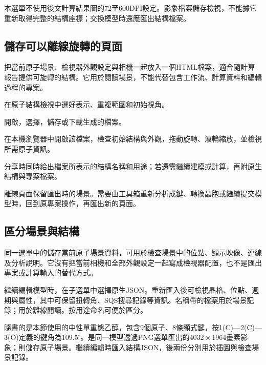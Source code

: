 本選單不使用後文計算結果圖的72至600DPI設定。影象檔案儲存檢視，不能據它重新取得完整的結構座標；交換模型時還應匯出結構檔案。



\subsection{儲存可以離線旋轉的頁面}

把當前原子場景、檢視器外觀設定與相機一起放入一個HTML檔案，適合隨計算報告提供可旋轉的結構。它用於閱讀場景，不能代替包含工作流、計算資料和編輯過程的專案。

\begin{steps}
\item 在原子結構檢視中選好表示、重複範圍和初始視角。
\item 開啟，選擇，儲存或下載生成的檔案。
\item 在本機瀏覽器中開啟該檔案，檢查初始結構與外觀，拖動旋轉、滾輪縮放，並檢視所需原子資訊。
\item 分享時同時給出檔案所表示的結構名稱和用途；若還需繼續建模或計算，再附原生結構與專案檔案。
\end{steps}

離線頁面保留匯出時的場景。需要由工具箱重新分析成鍵、轉換晶胞或繼續提交模型時，回到原專案操作，再匯出新的頁面。

\subsection{區分場景與結構}

同一選單中的儲存當前原子場景資料，可用於檢查場景中的位點、顯示映像、連線及分析說明。它沒有把當前相機和全部外觀設定一起寫成檢視器配置，也不是匯出專案或計算輸入的替代方式。

繼續編輯模型時，在子選單中選擇原生JSON。重新匯入後可檢視晶格、位點、週期與屬性，其中可保留扭轉角、SQS搜尋記錄等資訊。名稱帶的檔案用於場景記錄；用於離線閱讀。按用途命名可便於區分。

隨書的是本節使用的中性單重態乙醇，包含9個原子、8條顯式鍵，按1(C)—2(C)—3(O)定義的鍵角為$109.5^\circ$。\mbox{}是同一模型透過PNG選單匯出的4032\,$\times$\,1964畫素影象；則儲存原子場景。繼續編輯時匯入結構JSON，後兩份分別用於插圖與檢查場景記錄。

